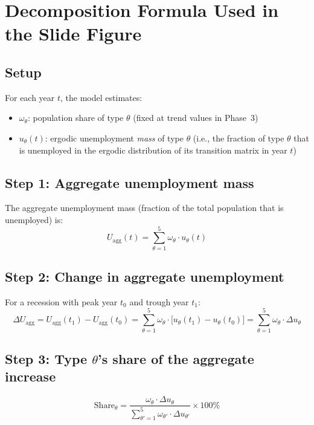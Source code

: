 \documentclass[12pt]{article}
\begin{document}
\section*{Decomposition Formula Used in the Slide Figure}

\subsection*{Setup}

For each year $t$, the model estimates:
\begin{itemize}
  \item $\omega_\theta$: population share of type $\theta$ (fixed at trend values in Phase~3)
  \item $u_\theta(t)$: ergodic unemployment \emph{mass} of type $\theta$ (i.e., the fraction of type $\theta$ that is unemployed in the ergodic distribution of its transition matrix in year $t$)
\end{itemize}

\subsection*{Step 1: Aggregate unemployment mass}

The aggregate unemployment mass (fraction of the total population that is unemployed) is:
\begin{equation}
  U_{\mathrm{agg}}(t) = \sum_{\theta=1}^{5} \omega_\theta \cdot u_\theta(t)
\end{equation}

\subsection*{Step 2: Change in aggregate unemployment}

For a recession with peak year $t_0$ and trough year $t_1$:
\begin{equation}
  \Delta U_{\mathrm{agg}} = U_{\mathrm{agg}}(t_1) - U_{\mathrm{agg}}(t_0) = \sum_{\theta=1}^{5} \omega_\theta \cdot \bigl[u_\theta(t_1) - u_\theta(t_0)\bigr] = \sum_{\theta=1}^{5} \omega_\theta \cdot \Delta u_\theta
\end{equation}

\subsection*{Step 3: Type $\theta$'s share of the aggregate increase}

\begin{equation}
  \boxed{\text{Share}_\theta = \frac{\omega_\theta \cdot \Delta u_\theta}{\sum_{\theta'=1}^{5} \omega_{\theta'} \cdot \Delta u_{\theta'}} \times 100\%}
\end{equation}
\end{document}
